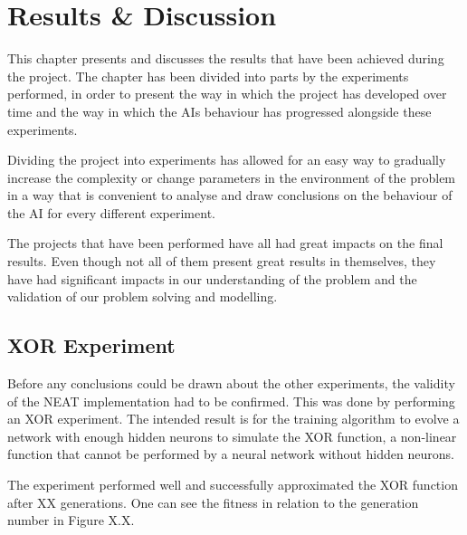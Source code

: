 
\chapter{Results \& Discussion}
This chapter presents and discusses the results that have been achieved during the project. The chapter has been divided into parts by the experiments performed, in order to present the way in which the project has developed over time and the way in which the AIs behaviour has progressed alongside these experiments.

Dividing the project into experiments has allowed for an easy way to gradually increase the complexity or change parameters in the environment of the problem in a way that is convenient to analyse and draw conclusions on the behaviour of the AI for every different experiment.

The projects that have been performed have all had great impacts on the final results. Even though not all of them present great results in themselves, they have had significant impacts in our understanding of the problem and the validation of our problem solving and modelling.


\section{XOR Experiment}
Before any conclusions could be drawn about the other experiments, the validity of the NEAT implementation had to be confirmed. This was done by performing an XOR experiment. The intended result is for the training algorithm to evolve a network with enough hidden neurons to simulate the XOR function, a non-linear function that cannot be performed by a neural network without hidden neurons.

The experiment performed well and successfully approximated the XOR function after XX generations. One can see the fitness in relation to the generation number in Figure X.X.

